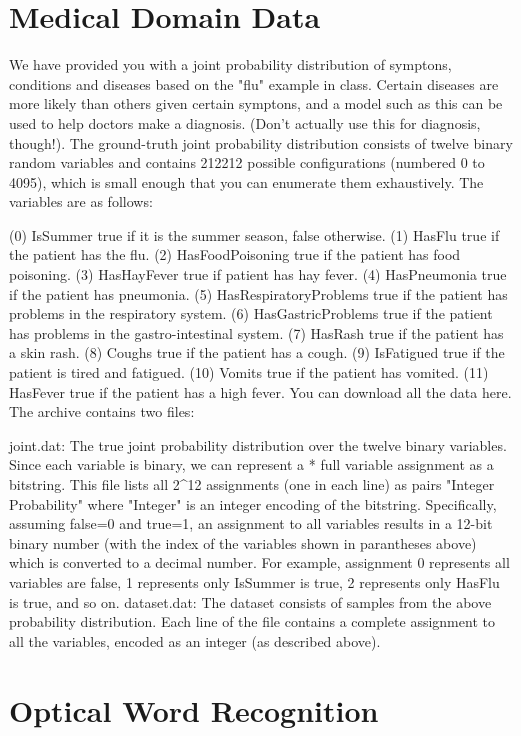 \section{Medical Domain Data}

We have provided you with a joint probability distribution of symptons, conditions and diseases based on the "flu" example in class. Certain diseases are more likely than others given certain symptons, and a model such as this can be used to help doctors make a diagnosis. (Don't actually use this for diagnosis, though!). The ground-truth joint probability distribution consists of twelve binary random variables and contains 212212 possible configurations (numbered 0 to 4095), which is small enough that you can enumerate them exhaustively. The variables are as follows:

(0) IsSummer true if it is the summer season, false otherwise.
(1) HasFlu true if the patient has the flu.
(2) HasFoodPoisoning true if the patient has food poisoning.
(3) HasHayFever true if patient has hay fever.
(4) HasPneumonia true if the patient has pneumonia.
(5) HasRespiratoryProblems true if the patient has problems in the respiratory system.
(6) HasGastricProblems true if the patient has problems in the gastro-intestinal system.
(7) HasRash true if the patient has a skin rash.
(8) Coughs true if the patient has a cough.
(9) IsFatigued true if the patient is tired and fatigued.
(10) Vomits true if the patient has vomited.
(11) HasFever true if the patient has a high fever.
You can download all the data here. The archive contains two files:

joint.dat: The true joint probability distribution over the twelve binary variables. Since each variable is binary, we can represent a * full variable assignment as a bitstring. This file lists all 2^12 assignments (one in each line) as pairs "Integer Probability" where "Integer" is an integer encoding of the bitstring. Specifically, assuming false=0 and true=1, an assignment to all variables results in a 12-bit binary number (with the index of the variables shown in parantheses above) which is converted to a decimal number. For example, assignment 0 represents all variables are false, 1 represents only IsSummer is true, 2 represents only HasFlu is true, and so on.
dataset.dat: The dataset consists of samples from the above probability distribution. Each line of the file contains a complete assignment to all the variables, encoded as an integer (as described above).

\section{Optical Word Recognition}

